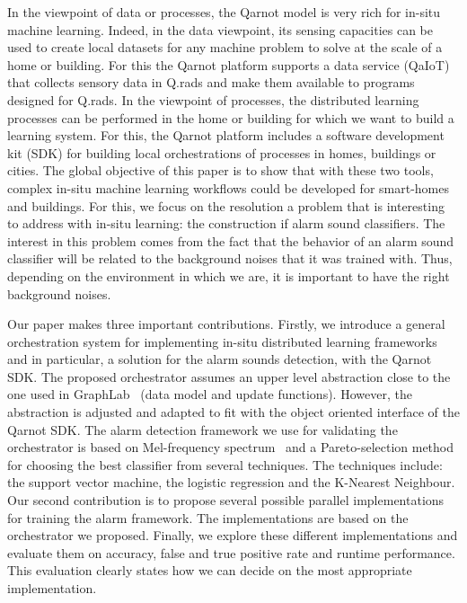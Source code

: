 \documentclass[10pt, conference, compsocconf]{IEEEtran}
\begin{document}
In the viewpoint of data or processes, the Qarnot model is very rich for in-situ machine learning. Indeed, in the data viewpoint, 
its sensing capacities can be used to create local datasets for any machine problem to solve at the scale of a home or building. 
For this the Qarnot platform supports a data service (QaIoT) that collects sensory data in Q.rads 
and make them available to programs designed for Q.rads. 
In the viewpoint of processes, the distributed learning processes can be performed in the home or building for which we want to 
build a learning system. For this, the Qarnot platform includes a software development kit (SDK) for building local orchestrations 
of processes in homes, buildings or cities.
The global objective of this paper is to show that with these two tools, 
complex in-situ machine learning workflows could be developed for smart-homes and buildings. For this, we focus on the resolution 
a problem that is interesting to address with in-situ learning: the construction if alarm sound classifiers. 
The interest in this problem comes from the fact that the behavior of an alarm sound classifier will be related to the background noises that 
it was trained with. Thus, depending on the environment in which we are, it is important to have the right background noises.

Our paper makes three important contributions. Firstly, we introduce a general orchestration system for implementing in-situ 
distributed learning frameworks and in particular, a solution for the alarm sounds detection, with the Qarnot SDK. 
The proposed orchestrator assumes an upper level abstraction close to the one used in GraphLab~\cite{Low:2012:DGF:2212351.2212354} (data model 
and update functions). However, the abstraction is adjusted and adapted to fit with the object oriented interface 
of the Qarnot SDK. 
The alarm detection framework we use for validating the orchestrator is based on Mel-frequency spectrum~\cite{Davis:1990:CPR:108235.108239} 
and a Pareto-selection method for choosing the best classifier from several techniques. The techniques include: the support vector 
machine, the logistic regression and the K-Nearest Neighbour. Our second contribution is to propose several possible parallel 
implementations for training the alarm framework. The implementations are based on the orchestrator we proposed.  
Finally, we explore these different implementations and evaluate them on accuracy, 
false and true positive rate and runtime performance. This evaluation clearly states how we can decide on the most appropriate 
implementation.
\end{document}
